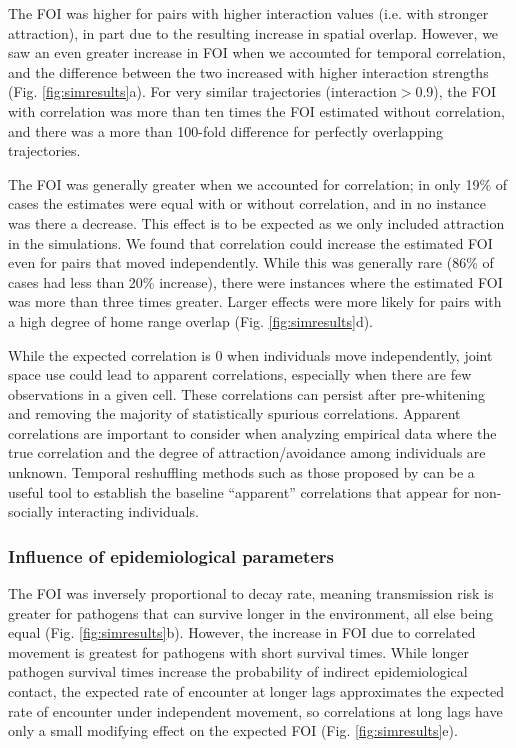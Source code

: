 ﻿\documentclass[11pt]{article}
\begin{document}
The FOI was higher for pairs with higher interaction values (i.e. with stronger attraction), in part due to the resulting increase in spatial overlap. 
However, we saw an even greater increase in FOI when we accounted for temporal correlation, and the difference between the two increased with higher interaction strengths (Fig. \ref{fig:simresults}a). For very similar trajectories (interaction$>$0.9), the FOI with correlation was more than ten times the FOI estimated without correlation, and there was a more than 100-fold difference for perfectly overlapping trajectories.  


The FOI was generally greater when we accounted for correlation; in only 19\% of cases the estimates were equal with or without correlation, and in no instance was there a decrease. This effect is to be expected as we only included attraction in the simulations. 
We found that correlation could increase the estimated FOI even for pairs that moved independently. While this was generally rare (86\% of cases had less than 20\% increase),
there were  instances where the estimated FOI was more than three times greater. Larger effects were more likely for pairs with a high degree of home range overlap (Fig. \ref{fig:simresults}d). 

While the expected correlation is 0 when individuals move independently, joint space use could lead to apparent correlations, especially when there are few observations in a given cell. These correlations can persist after pre-whitening and removing the majority of statistically spurious correlations. Apparent correlations are important to consider when analyzing empirical data where the true correlation and the degree of attraction/avoidance among individuals are unknown. Temporal reshuffling methods such as those proposed by \citet{Spiegel2016} can be a useful tool to establish the baseline ``apparent'' correlations that appear for non-socially interacting individuals.

\subsubsection*{Influence of epidemiological parameters}

The FOI was inversely proportional to decay rate, meaning transmission risk is greater for pathogens that can survive longer in the environment, all else being equal (Fig. \ref{fig:simresults}b).
However, the increase in FOI due to correlated movement is greatest for pathogens with short survival times. While longer pathogen survival times increase the probability of indirect epidemiological contact, the expected rate of encounter at longer lags approximates the expected rate of encounter under independent movement, so correlations at long lags have only a small modifying effect on the expected FOI (Fig. \ref{fig:simresults}e). 
\end{document}
